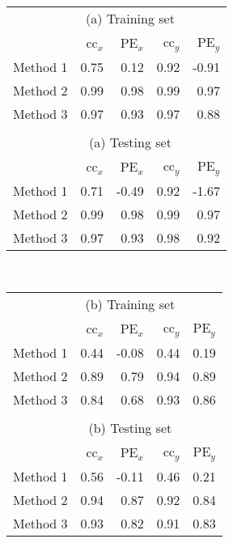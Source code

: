 \documentclass[linenumbers,draft]{agujournal}
\begin{document}
\begin{table}
  \begin{tabular}{ l r r r r }
& \multicolumn{3}{c}{(a) Training set}\\
& cc$_x$ & PE$_x$ & cc$_y$ & PE$_y$\\
\hline
Method 1 & 0.75 & 0.12 & 0.92 & -0.91\\
Method 2 & 0.99 & 0.98 & 0.99 & 0.97\\
Method 3 & 0.97 & 0.93 & 0.97 & 0.88\\
\\
& \multicolumn{3}{c}{(a) Testing set}\\
& cc$_x$ & PE$_x$ & cc$_y$ & PE$_y$\\
\hline
Method 1 & 0.71 & -0.49 & 0.92 & -1.67\\
Method 2 & 0.99 & 0.98 & 0.99 & 0.97\\
Method 3 & 0.97 & 0.93 & 0.98 & 0.92\\
%    
  \end{tabular}
\\
  \begin{tabular}{ l r r r r }
& \multicolumn{3}{c}{(b) Training set}\\
& cc$_x$ & PE$_x$ & cc$_y$ & PE$_y$\\
\hline
Method 1 & 0.44 & -0.08 & 0.44 & 0.19\\
Method 2 & 0.89 & 0.79 & 0.94 & 0.89\\
Method 3 & 0.84 & 0.68 & 0.93 & 0.86\\
\\
& \multicolumn{3}{c}{(b) Testing set}\\
& cc$_x$ & PE$_x$ & cc$_y$ & PE$_y$\\
\hline
Method 1 & 0.56 & -0.11 & 0.46 & 0.21\\
Method 2 & 0.94 & 0.87 & 0.92 & 0.84\\
Method 3 & 0.93 & 0.82 & 0.91 & 0.83\\
%    
  \end{tabular}
\end{table}
\clearpage
\end{document}
